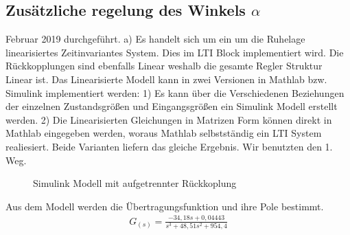\documentclass[10pt]{scrartcl}
\begin{document}
\subsection{Zusätzliche regelung des Winkels $\alpha$ }
Februar 2019 durchgeführt.
a)	Es handelt sich um ein um die Ruhelage linearisiertes Zeitinvariantes System. Dies im LTI Block implementiert wird. Die Rückkopplungen sind ebenfalls Linear weshalb die gesamte Regler Struktur Linear ist.
Das Linearisierte Modell kann in zwei Versionen in Mathlab bzw. Simulink implementiert werden:
1) Es kann über die Verschiedenen Beziehungen der einzelnen Zustandsgrößen und Eingangsgrößen ein Simulink Modell erstellt werden.
2) Die Linearisierten Gleichungen in Matrizen Form können direkt in Mathlab eingegeben werden, woraus Mathlab selbstständig ein LTI System realiesiert. 
Beide Varianten liefern das gleiche Ergebnis.
Wir benutzten den 1. Weg. 
\begin{figure} 
\caption{Simulink Modell mit aufgetrennter Rückkoplung} 
\end{figure}
Aus dem Modell werden die Übertragungsfunktion und ihre Pole bestimmt.
\begin{align}
   G_{(s)}=\frac{-34,18s+0,04443}{s^3+48,51s^2+954,4}
\end{align}
\end{document}
